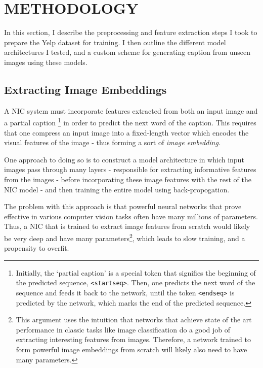 \documentclass[letterpaper, 10 pt, conference]{ieeeconf}
\begin{document}
\section{METHODOLOGY}

In this section, I describe the preprocessing and feature extraction steps I took to prepare the Yelp dataset for training. I then outline the different model architectures I tested, and a custom scheme for generating caption from unseen images using these models. 

\subsection{Extracting Image Embeddings}

A NIC system must incorporate features extracted from both an input image and a partial caption \footnote{Initially, the `partial caption' is a special token that signifies the beginning of the predicted sequence, \texttt{<startseq>}. Then, one predicts the next word of the sequence and feeds it back to the network, until the token \texttt{<endseq>} is predicted by the network, which marks the end of the predicted sequence.} in order to predict the next word of the caption. This requires that one compress an input image into a fixed-length vector which encodes the visual features of the image - thus forming a sort of \emph{image embedding.}

One approach to doing so is to construct a model architecture in which input images pass through many layers - responsible for extracting informative features from the images - before incorporating these image features with the rest of the NIC model - and then training the entire model using back-propogation.  

The problem with this approach is that powerful neural networks that prove effective in various computer vision tasks often have many millions of parameters. Thus, a NIC that is trained to extract image features from scratch would likely be very deep and have many parameters\footnote{This argument uses the intuition that networks that achieve state of the art performance in classic tasks like image classification do a good job of extracting interesting features from images. Therefore, a network trained to form powerful image embeddings from scratch will likely also need to have many parameters.}, which leads to slow training, and a propensity to overfit.
\end{document}
